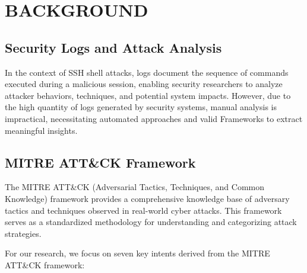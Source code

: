 

\section{BACKGROUND}


    \subsection{Security Logs and Attack Analysis}
    

        In the context of SSH shell attacks, logs document the sequence of commands executed during a malicious session, enabling security researchers to analyze attacker behaviors, techniques, and potential system impacts. However, due to the high quantity of logs generated by security systems, manual analysis is impractical, necessitating automated approaches and valid Frameworks to extract meaningful insights.

    \subsection{MITRE ATT\&CK Framework}
    
        The MITRE ATT\&CK (Adversarial Tactics, Techniques, and Common Knowledge) framework provides a comprehensive knowledge base of adversary tactics and techniques observed in real-world cyber attacks. This framework serves as a standardized methodology for understanding and categorizing attack strategies.

        \noindent For our research, we focus on seven key intents derived from the MITRE ATT\&CK framework:


